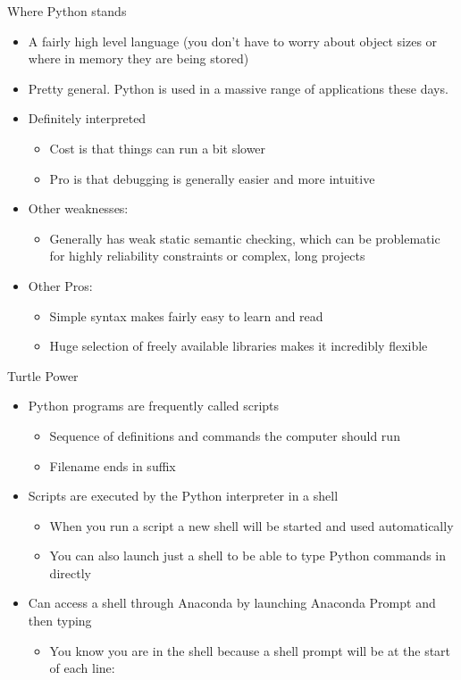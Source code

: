 \documentclass[pdf, aspectratio=169, 12pt]{beamer}
\begin{document}
\begin{frame}{Where Python stands}
	\begin{itemize}[<+->]
		\item A fairly high level language (you don't have to worry about object sizes or where in memory they are being stored)
		\item Pretty general. Python is used in a massive range of applications these days.
		\item Definitely interpreted
			\begin{itemize}
				\item Cost is that things can run a bit slower
				\item Pro is that debugging is generally easier and more intuitive
			\end{itemize}
		\item Other weaknesses:
			\begin{itemize}
				\item Generally has weak static semantic checking, which can be problematic for highly reliability constraints or complex, long projects
			\end{itemize}
		\item Other Pros:
			\begin{itemize}
				\item Simple syntax makes fairly easy to learn and read
				\item Huge selection of freely available libraries makes it incredibly flexible
			\end{itemize}
	\end{itemize}
\end{frame}

\begin{frame}{Turtle Power}
	\begin{itemize}
		\item Python programs are frequently called scripts
			\begin{itemize}
				\item Sequence of definitions and commands the computer should run
				\item Filename ends in  suffix
			\end{itemize}
		\item Scripts are executed by the Python interpreter in a \alert{shell}
			\begin{itemize}
				\item When you run a script a new shell will be started and used automatically
				\item You can also launch just a shell to be able to type Python commands in directly
			\end{itemize}
		\item Can access a shell through Anaconda by launching \alert{Anaconda Prompt} and then typing 
			\begin{itemize}
				\item You know you are in the shell because a \alert{shell prompt} will be at the start of each line: \pyi{>>>}
			\end{itemize}
	\end{itemize}
\end{frame}
\end{document}
